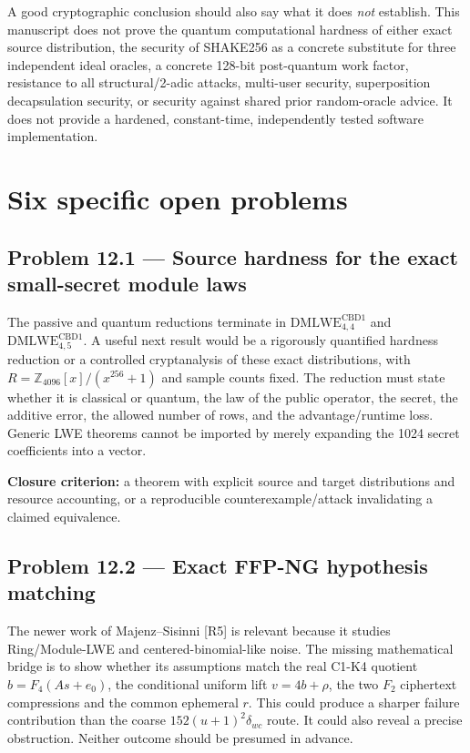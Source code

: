 \documentclass[
  11pt,
  a4paper,
  oneside]{report}
\begin{document}
A good cryptographic conclusion should also say what it does \emph{not}
establish. This manuscript does not prove the quantum computational
hardness of either exact source distribution, the security of SHAKE256
as a concrete substitute for three independent ideal oracles, a concrete
128-bit post-quantum work factor, resistance to all structural/2-adic
attacks, multi-user security, superposition decapsulation security, or
security against shared prior random-oracle advice. It does not provide
a hardened, constant-time, independently tested software implementation.

\section{Six specific open problems}\label{six-specific-open-problems}

\subsection{Problem 12.1 --- Source hardness for the exact small-secret
module
laws}\label{problem-12.1-source-hardness-for-the-exact-small-secret-module-laws}

The passive and quantum reductions terminate in
\(\mathrm{DMLWE}_{4,4}^{\mathrm{CBD1}}\) and
\(\mathrm{DMLWE}_{4,5}^{\mathrm{CBD1}}\). A useful next result would be
a rigorously quantified hardness reduction or a controlled cryptanalysis
of these exact distributions, with \(R=\mathbb Z_{4096}[x]/(x^{256}+1)\)
and sample counts fixed. The reduction must state whether it is
classical or quantum, the law of the public operator, the secret, the
additive error, the allowed number of rows, and the advantage/runtime
loss. Generic LWE theorems cannot be imported by merely expanding the
1024 secret coefficients into a vector.

\textbf{Closure criterion:} a theorem with explicit source and target
distributions and resource accounting, or a reproducible
counterexample/attack invalidating a claimed equivalence.

\subsection{Problem 12.2 --- Exact FFP-NG hypothesis
matching}\label{problem-12.2-exact-ffp-ng-hypothesis-matching}

The newer work of Majenz--Sisinni {[}R5{]} is relevant because it
studies Ring/Module-LWE and centered-binomial-like noise. The missing
mathematical bridge is to show whether its assumptions match the real
C1-K4 quotient \(b=F_4(As+e_0)\), the conditional uniform lift
\(v=4b+\rho\), the two \(F_2\) ciphertext compressions and the common
ephemeral \(r\). This could produce a sharper failure contribution than
the coarse \(152(u+1)^2\delta_{wc}\) route. It could also reveal a
precise obstruction. Neither outcome should be presumed in advance.
\end{document}
